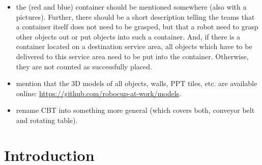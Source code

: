 \documentclass[11pt, twoside, openright, a4paper, chapterprefix]{scrbook}
\begin{document}


\begin{itemize}

	
	
	\item the (red and blue) container should be mentioned somewhere (also with a pictures). Further, there should be a short description telling the teams that a container itself does not need to be grasped, but that a robot need to grasp other objects out or put objects into such a container. And, if there is a container located on a destination service area, all objects which have to be delivered to this service area need to be put into the container. Otherwise, they are not counted as successfully placed.
	
	
	\item mention that the 3D models of all objects, walls, PPT tiles, etc. are available online: \url{https://github.com/robocup-at-work/models}.
	
	\item rename CBT into something more general (which covers both, conveyor belt and rotating table).
		
	
\end{itemize}


\pagestyle{empty}
\tableofcontents
\clearpage

\pagestyle{plain}

\chapter{Introduction}








\end{document}
